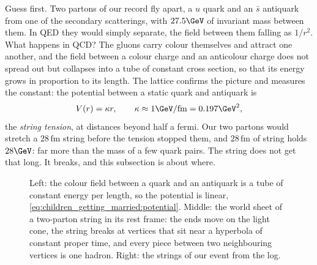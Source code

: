 Guess first. Two partons of our record fly apart, a $u$ quark and an $\bar s$
antiquark from one of the secondary scatterings, with $27.5\GeV$ of
invariant mass between them. In QED they would simply separate, the field
between them falling as $1/r^2$. What happens in QCD? The gluons carry
colour themselves and attract one another, and the field between a colour
charge and an anticolour charge does not spread out but collapses into a
tube of constant cross section, so that its energy grows in proportion to
its length. The lattice confirms the picture and measures the constant: the
potential between a static quark and antiquark is
\begin{equation}
  V(r)=\kappa r,\qquad \kappa\approx1\GeV/\mathrm{fm}=0.197\GeV^2,
  \label{eq:children_getting_married:potential}
\end{equation}
the \emph{string tension}, at distances beyond half a fermi. Our two
partons would stretch a $28\,\mathrm{fm}$ string before the tension stopped
them, and $28\,\mathrm{fm}$ of string holds $28\GeV$: far more than the
mass of a few quark pairs. The string does not get that long. It breaks,
and this subsection is about where.

\begin{figure}[htbp]\centering
\resizebox{\textwidth}{!}{}
\caption[The Lund string, its world sheet and the strings of our event]{Left:
the colour field between a quark and an antiquark is a tube of constant
energy per length, so the potential is linear,
\cref{eq:children_getting_married:potential}. Middle: the world sheet of a
two-parton string in its rest frame: the ends move on the light cone, the
string breaks at vertices that sit near a hyperbola of constant proper
time, and every piece between two neighbouring vertices is one hadron.
Right: the strings of our event from the  log.}
\label{fig:children_getting_married:string_sketch}
\end{figure}

